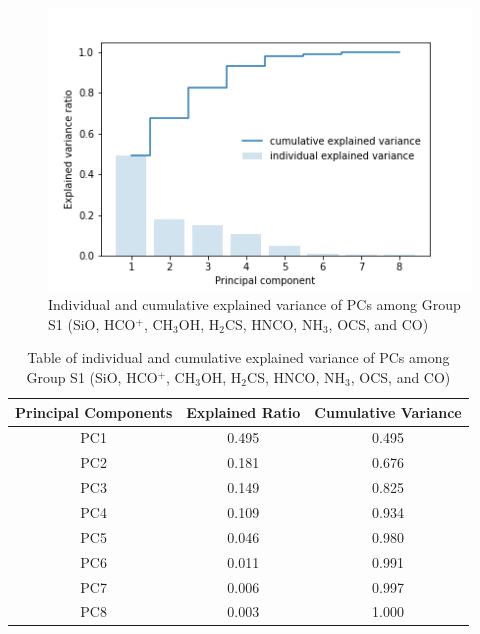 \documentclass{aa}
\begin{document}
\begin{CJK*}{UTF8}{gbsn}
    \begin{figure}[htbp]
       \centering
       \captionsetup{justification=centering}
       \includegraphics[angle=0,scale =0.6]{shock-1/explained_variance_ratio.png}
       \caption{Individual and cumulative explained variance of PCs among Group S1 (SiO, HCO$^+$, CH$_3$OH, H$_2$CS, HNCO, NH$_3$, OCS, and CO)}
             \label{Fig-shock-1-varianve}
     \end{figure}

    \begin{table}[htbp]
        \centering
        \begin{tabular}{ccc}
        \hline\hline
        \multicolumn{1}{l}{Principal Components} & \multicolumn{1}{l}{Explained Ratio} & Cumulative Variance \\ \hline
                PC1 & 0.495  & 0.495\\ 
                PC2 & 0.181  & 0.676\\
                PC3 & 0.149  & 0.825\\
                PC4 & 0.109  & 0.934\\ 
                PC5 & 0.046  & 0.980\\
                PC6 & 0.011  & 0.991\\
                PC7 & 0.006  & 0.997\\
                PC8 & 0.003  & 1.000\\\hline\hline
        \end{tabular}
        \caption{Table of individual and cumulative explained variance of PCs among Group S1 (SiO, HCO$^+$, CH$_3$OH, H$_2$CS, HNCO, NH$_3$, OCS, and CO)}
        \label{table-shock-1-1}
    \end{table}



\end{CJK*}
\end{document}
